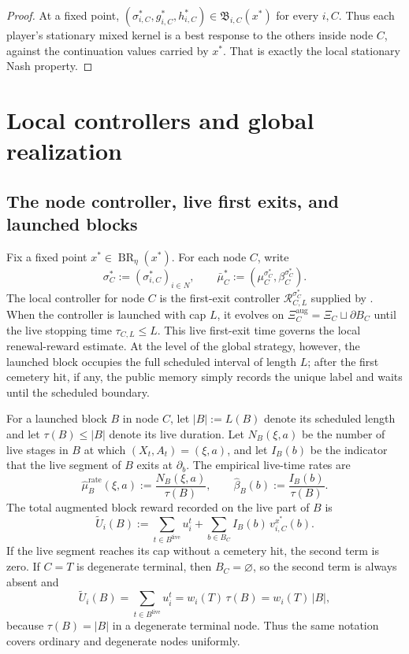 \documentclass[12pt]{article}
\theoremstyle{definition}
\newcommand{\1}{\mathbf{1}}
\DeclareMathOperator{\BR}{BR}
\begin{document}
\begin{proof}
At a fixed point,
$(\sigma_{i,C}^*,g_{i,C}^*,h_{i,C}^*)\in\mathfrak B_{i,C}(x^*)$ for every $i,C$.
Thus each player's stationary mixed kernel is a best response to the others inside
node $C$, against the continuation values carried by $x^*$. That is exactly the
local stationary Nash property.
\end{proof}

\section{Local controllers and global realization}
\label{sec:realization}


\subsection{The node controller, live first exits, and launched blocks}

Fix a fixed point $x^*\in\BR_\eta(x^*)$. For each node $C$, write
\[
\sigma_C^*:=(\sigma_{i,C}^*)_{i\in N},
\qquad
\bar\mu_C^*:=(\mu_C^{\sigma_C^*},\beta_C^{\sigma_C^*}).
\]
The local controller for node $C$ is the first-exit controller
$\mathcal R_{C,L}^{\sigma_C^*}$ supplied by . When the
controller is launched with cap $L$, it evolves on
$\Xi_C^{\mathrm{aug}}=\Xi_C\sqcup\partial B_C$ until the live stopping time
$\tau_{C,L}\le L$. This live first-exit time governs the local renewal-reward
estimate. At the level of the global strategy, however, the launched block
occupies the full scheduled interval of length $L$; after the first cemetery
hit, if any, the public memory simply records the unique label and waits until
the scheduled boundary.

For a launched block $B$ in node $C$, let $|B|:=L(B)$ denote its scheduled
length and let $\tau(B)\le |B|$ denote its live duration. Let $N_B(\xi,a)$ be the
number of live stages in $B$ at which $(X_t,A_t)=(\xi,a)$, and let $I_B(b)$ be
the indicator that the live segment of $B$ exits at $\partial_b$. The empirical
live-time rates are
\[
\widehat\mu_B^{\mathrm{rate}}(\xi,a):=\frac{N_B(\xi,a)}{\tau(B)},
\qquad
\widehat\beta_B(b):=\frac{I_B(b)}{\tau(B)}.
\]
The total augmented block reward recorded on the live part of $B$ is
\begin{equation}
\label{eq:aug-block-payoff}
\widetilde U_i(B)
:=
\sum_{t\in B^{\mathrm{live}}} u_i^t
+
\sum_{b\in B_C}I_B(b)\,v_{i,C}^{x^*}(b).
\end{equation}
If the live segment reaches its cap without a cemetery hit, the second term is
zero. If $C=T$ is degenerate terminal, then $B_C=\varnothing$, so the second term
is always absent and
\[
\widetilde U_i(B)=\sum_{t\in B^{\mathrm{live}}}u_i^t
= w_i(T)\,\tau(B)
= w_i(T)\,|B|,
\]
because $\tau(B)=|B|$ in a degenerate terminal node. Thus the same notation
covers ordinary and degenerate nodes uniformly.
\end{document}
